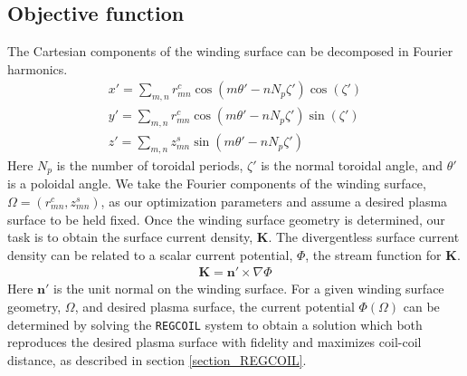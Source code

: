 \documentclass[aps,unsortedaddress]{revtex4-1}
\begin{document}
\subsection{Objective function}
The Cartesian components of the winding surface can be decomposed in Fourier harmonics.
\begin{gather}
x' = \sum_{m,n} r_{mn}^c \cos(m \theta' - n N_p \zeta') \cos (\zeta') \\
y' = \sum_{m,n} r_{mn}^c \cos(m \theta' - n N_p \zeta') \sin (\zeta') \\
z' = \sum_{m,n} z_{mn}^s \sin(m \theta' - n N_p \zeta') 
\label{Fourier}
\end{gather}
Here $N_p$ is the number of toroidal periods, $\zeta'$ is the normal toroidal angle, and $\theta'$ is a poloidal angle. We take the Fourier components of the winding surface, $\Omega = (r_{mn}^c, z_{mn}^s)$, as our optimization parameters and assume a desired plasma surface to be held fixed. Once the winding surface geometry is determined, our task is to obtain the surface current density, $\bm{K}$. The divergentless surface current density can be related to a scalar current potential, $\Phi$, the stream function for $\bm{K}$.
\begin{gather}
\bm{K} = \bm{n}' \times \nabla \Phi
\end{gather}
Here $\bm{n}'$ is the unit normal on the winding surface. For a given winding surface geometry, $\Omega$, and desired plasma surface, the current potential $\Phi (\Omega)$ can be determined by solving the \texttt{REGCOIL} system to obtain a solution which both reproduces the desired plasma surface with fidelity and maximizes coil-coil distance, as described in section \ref{section_REGCOIL}.
\end{document}
